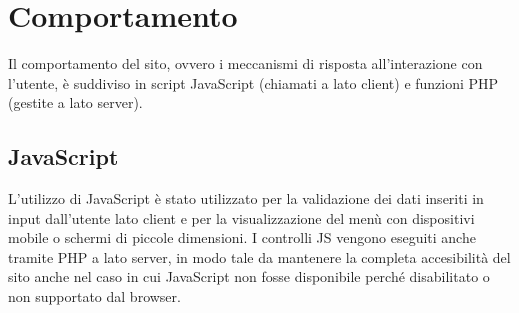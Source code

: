 \section{Comportamento}
Il comportamento del sito, ovvero i meccanismi di risposta all'interazione con l'utente, è suddiviso in script JavaScript (chiamati a lato client) e funzioni PHP (gestite a lato server).
    \subsection{JavaScript}
        L'utilizzo di JavaScript è stato utilizzato per la validazione dei dati inseriti in input dall'utente lato client e per la visualizzazione del menù con dispositivi mobile o schermi di piccole dimensioni.
        I controlli JS vengono eseguiti anche tramite PHP a lato server, in modo tale da mantenere la completa accesibilità del sito anche nel caso in cui JavaScript non fosse disponibile perché disabilitato o non supportato dal browser.
